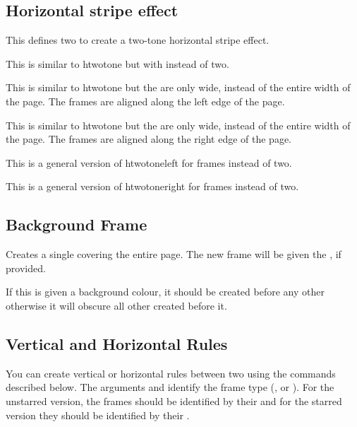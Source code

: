 \documentclass[fontsize=12pt]{scrbook}
\begin{document}
\subsection{Horizontal stripe effect}\label{sec:hstripes}

This defines two  to create a two-tone
horizontal stripe effect.

This is similar to \gls{htwotone} but with 
 instead of two.

This is similar to \gls{htwotone} but the  are only
 wide, instead of the entire width of the page.
The frames are aligned along the left edge of the page.

This is similar to \gls{htwotone} but the  are only
 wide, instead of the entire width of the page.
The frames are aligned along the right edge of the page.

This is a general version of \gls{htwotoneleft} for
 frames instead of two.

This is a general version of \gls{htwotoneright} for
 frames instead of two.

\subsection{Background Frame}\label{sec:backgroundframe}

Creates a single  covering the entire page.
The new frame will be given the  , if provided.

\begin{important}
If this  is given a background colour, it
should be created before any other  otherwise it
will obscure all other  created before it.
\end{important}

\subsection{Vertical and Horizontal Rules}
\label{sec:insertrule}

You can create vertical or horizontal rules between two
 using the commands described below.  The arguments
 and  identify the frame type
(,  or ).  For the
unstarred version, the frames should be identified by their
 and for the starred version they should be identified by
their .
\end{document}
